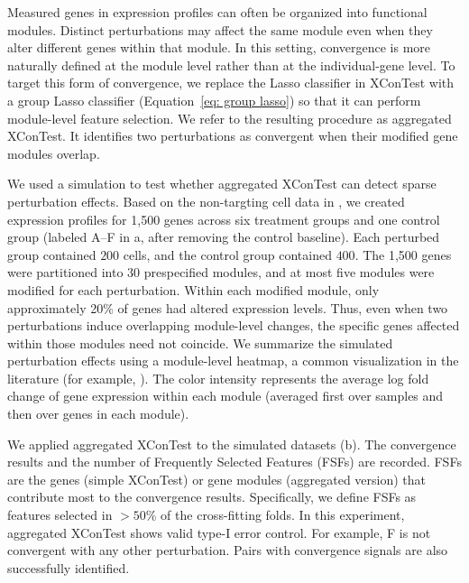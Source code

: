 \documentclass[11pt]{article}
\newenvironment{revblockr3}
  {\color[RGB]{210,110,110}}
  {}
\begin{document}
\begin{revblockr3}
Measured genes in expression profiles can often be organized into functional modules. Distinct perturbations may affect the same module even when they alter different genes within that module. In this setting, convergence is more naturally defined at the module level rather than at the individual-gene level. To target this form of convergence, we replace the Lasso classifier in XConTest with a group Lasso classifier (Equation~\eqref{eq: group lasso}) so that it can perform module-level feature selection. We refer to the resulting procedure as aggregated XConTest. It identifies two perturbations as convergent when their modified gene modules overlap.

We used a simulation to test whether aggregated XConTest can detect sparse perturbation effects. Based on the non-targting cell data in \cite{shi2026genome}, we created expression profiles for 1,500 genes across six treatment groups and one control group (labeled A--F in a, after removing the control baseline). Each perturbed group contained $200$ cells, and the control group contained $400$. The 1,500 genes were partitioned into 30 prespecified modules, and at most five modules were modified for each perturbation. Within each modified module, only approximately 20\% of genes had altered expression levels. Thus, even when two perturbations induce overlapping module-level changes, the specific genes affected within those modules need not coincide. We summarize the simulated perturbation effects using a module-level heatmap, a common visualization in the literature (for example, \cite{schnitzler2024convergence}). The color intensity represents the average log fold change of gene expression within each module (averaged first over samples and then over genes in each module).

We applied aggregated XConTest to the simulated datasets (b). The convergence results and the number of Frequently Selected Features (FSFs) are recorded. FSFs are the genes (simple XConTest) or gene modules (aggregated version) that contribute most to the convergence results. Specifically, we define FSFs as features selected in $>50\%$ of the cross-fitting folds. In this experiment, aggregated XConTest shows valid type-I error control. For example, F is not convergent with any other perturbation. Pairs with convergence signals are also successfully identified.



\end{revblockr3}
\end{document}
